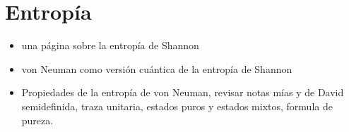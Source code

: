 \section{Entropía}
\begin{itemize}
\item una página sobre la entropía de Shannon
\item von Neuman como versión cuántica de la entropía de Shannon
\item Propiedades de la entropía de von Neuman, revisar notas mías y de David semidefinida, traza unitaria, estados puros y estados mixtos, formula de pureza.
\end{itemize}
